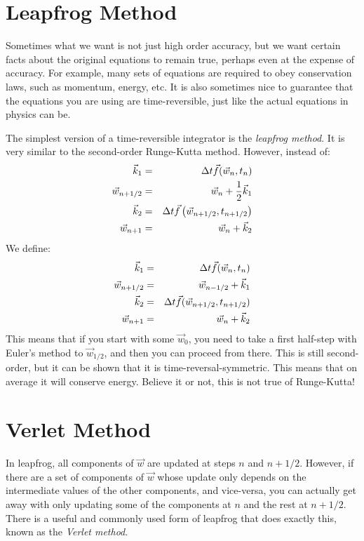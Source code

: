 \section{Leapfrog Method}

Sometimes what we want is not just high order accuracy, but we want
certain facts about the original equations to remain true, perhaps
even at the expense of accuracy. For example, many sets of equations
are required to obey conservation laws, such as momentum, energy,
etc. It is also sometimes nice to guarantee that the equations you are
using are time-reversible, just like the actual equations in physics
can be.

The simplest version of a time-reversible integrator is the {\it leapfrog
  method}. It is very similar to the second-order Runge-Kutta method. 
However, instead of:
\begin{eqnarray}
\vec{k}_1 &=& \Delta t \vec{f}(\vec{w}_n, t_n) \cr
\vec{w}_{n+1/2} &=& \vec{w}_n + \frac{1}{2}\vec{k}_1 \cr
\vec{k}_2 &=& \Delta t \vec{f}\left(\vec{w}_{n+1/2}, t_{n+1/2}\right) \cr
\vec{w}_{n+1} &=& \vec{w}_n + \vec{k}_2
\end{eqnarray}
We define:
\begin{eqnarray}
\vec{k}_1 &=& \Delta t \vec{f}(\vec{w}_n, t_n) \cr
\vec{w}_{n+1/2} &=& \vec{w}_{n-1/2} + \vec{k}_1 \cr
\vec{k}_2 &=& \Delta t \vec{f}(\vec{w}_{n+1/2}, t_{n+1/2}) \cr
\vec{w}_{n+1} &=& \vec{w}_{n} + \vec{k}_2
\end{eqnarray}
This means that if you start with some $\vec{w}_0$, you need to take a
first half-step with Euler's method to $\vec{w}_{1/2}$, and then you
can proceed from there. This is still second-order, but it can be
shown that it is time-reversal-symmetric. This means that on average
it will conserve energy. Believe it or not, this is not true of
Runge-Kutta!

\section{Verlet Method}

In leapfrog, all components of $\vec{w}$ are updated at steps $n$ and
$n+1/2$. However, if there are a set of components of $\vec{w}$ whose
update only depends on the intermediate values of the other
components, and vice-versa, you can actually get away with only
updating some of the components at $n$ and the rest at $n+1/2$. There
is a useful and commonly used form of leapfrog that does exactly this,
known as the {\it Verlet method}.

